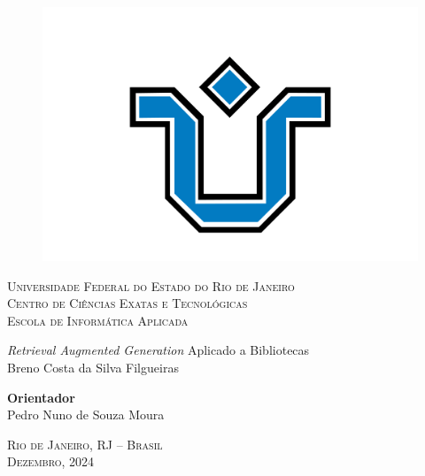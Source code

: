 \documentclass[a4paper, 12pt]{article}
\begin{document}
\setcounter{page}{1}

\thispagestyle{empty}

    \begin{center}
        \begin{figure}
            \centering
            \includegraphics[scale=0.18]{unirio.png}
            \label{fig:unirio-logo}
        \end{figure}
        
        \fontsize{13}{15}
        
        \textsc{
            Universidade Federal do Estado do Rio de Janeiro\\
            Centro de Ciências Exatas e Tecnológicas\\
            Escola de Informática Aplicada\\
        }
        \vspace{2.8cm}
        
        \textit{Retrieval Augmented Generation} Aplicado a Bibliotecas\\
        
        \vspace{2.8cm}
        Breno Costa da Silva Filgueiras
        \vspace{2.8cm}

        \begin{flushright}
            \textbf{Orientador}\\
            Pedro Nuno de Souza Moura
        \end{flushright}

        \vspace*{\fill}
        
        \textsc{Rio de Janeiro, RJ -- Brasil\\ Dezembro, 2024}
    \end{center}
\end{document}
